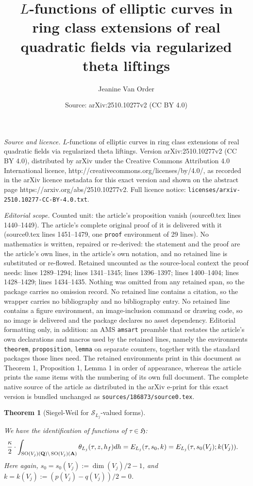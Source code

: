 \documentclass[10pt,a4paper]{amsart}
\title{$L$-functions of elliptic curves in ring class extensions of real quadratic fields via regularized theta liftings}
\author{Jeanine Van Order}
\date{Source: arXiv:2510.10277v2 (CC BY 4.0)}
\newtheorem{theorem}{Theorem}
\begin{document}
\maketitle

\noindent\emph{Source and licence.} $L$-functions of elliptic curves in ring class extensions of real quadratic fields via regularized theta liftings. Version arXiv:2510.10277v2 (CC BY 4.0), distributed by arXiv under the Creative Commons Attribution 4.0 International licence, http://creativecommons.org/licenses/by/4.0/, as recorded in the arXiv licence metadata for this exact version and shown on the abstract page https://arxiv.org/abs/2510.10277v2. Full licence notice: \texttt{licenses/arxiv-2510.10277-CC-BY-4.0.txt}.\par\smallskip

\noindent\textit{Editorial scope.} Counted unit: the article's proposition vanish (source0.tex lines 1440--1449). The article's complete original proof of it is delivered with it (source0.tex lines 1451--1479, one \texttt{proof} environment of 29 lines). No mathematics is written, repaired or re-derived: the statement and the proof are the article's own lines, in the article's own notation, and no retained line is substituted or re-flowed.  Retained uncounted as the source-local context the proof needs: lines 1289--1294; lines 1341--1345; lines 1396--1397; lines 1400--1404; lines 1428--1429; lines 1434--1435.  Nothing was omitted from any retained span, so the package carries no omission record.  No retained line contains a citation, so the wrapper carries no bibliography and no bibliography entry.  No retained line contains a figure environment, an image-inclusion command or drawing code, so no image is delivered and the package declares no asset dependency.  Editorial formatting only, in addition: an AMS \texttt{amsart} preamble that restates the article's own declarations and macros used by the retained lines, namely the environments \texttt{theorem}, \texttt{proposition}, \texttt{lemma} on separate counters, together with the standard packages those lines need.  The retained environments print in this document as Theorem 1, Proposition 1, Lemma 1 in order of appearance, whereas the article prints the same items with the numbering of its own full document.  The complete native source of the article as distributed in the arXiv e-print for this exact version is bundled unchanged as \texttt{sources/186873/source0.tex}.
\begin{theorem}[Siegel-Weil for $\mathcal{S}_{L_j}$-valued forms]\label{SW-vector} 

We have the identification of functions of $\tau \in \mathfrak{H}$:
\begin{align*} \frac{\kappa}{2} \cdot \int_{ \operatorname{SO}(V_j)({\bf{Q}}) \backslash \operatorname{SO}(V_j)({\bf{A}})}
\theta_{L_j}(\tau, z, h_f) dh &= E_{L_j}(\tau, s_0, k) = E_{L_j}(\tau, s_0(V_j); k(V_j)). \end{align*}
Here again, $s_0 = s_0(V_j) := \dim(V_j)/2 -1$, and $k = k(V_j) := (p(V_j) - q(V_j))/2 = 0$. \end{theorem}
\end{document}
